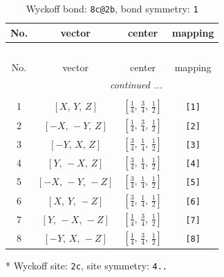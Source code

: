 \documentclass[fleqn,8pt]{jsarticle}
\begin{document}
\renewcommand{\arraystretch}{1.2}
\begin{longtable}{cccc}
\caption{Wyckoff bond: {\tt 8c@2b}, bond symmetry: {\tt 1}}
 \\
 \hline \hline
No. & vector & center & mapping \\ \hline \endfirsthead

\multicolumn{3}{l}{\tablename\ \thetable{}} \\
 \hline \hline
No. & vector & center & mapping \\ \hline \endhead

 \hline \hline
\multicolumn{3}{r}{\footnotesize\it continued ...} \\ \endfoot

 \hline \hline
\multicolumn{3}{r}{} \\ \endlastfoot

1 & $\left[ X,\, Y,\, Z \right]$ & $\left[ \frac{1}{4},\, \frac{3}{4},\, \frac{1}{2} \right]$ & {\tt [1]} \\ \hline
2 & $\left[ - X,\, - Y,\, Z \right]$ & $\left[ \frac{1}{4},\, \frac{3}{4},\, \frac{1}{2} \right]$ & {\tt [2]} \\ \hline
3 & $\left[ - Y,\, X,\, Z \right]$ & $\left[ \frac{3}{4},\, \frac{1}{4},\, \frac{1}{2} \right]$ & {\tt [3]} \\ \hline
4 & $\left[ Y,\, - X,\, Z \right]$ & $\left[ \frac{3}{4},\, \frac{1}{4},\, \frac{1}{2} \right]$ & {\tt [4]} \\ \hline
5 & $\left[ - X,\, - Y,\, - Z \right]$ & $\left[ \frac{3}{4},\, \frac{1}{4},\, \frac{1}{2} \right]$ & {\tt [5]} \\ \hline
6 & $\left[ X,\, Y,\, - Z \right]$ & $\left[ \frac{3}{4},\, \frac{1}{4},\, \frac{1}{2} \right]$ & {\tt [6]} \\ \hline
7 & $\left[ Y,\, - X,\, - Z \right]$ & $\left[ \frac{1}{4},\, \frac{3}{4},\, \frac{1}{2} \right]$ & {\tt [7]} \\ \hline
8 & $\left[ - Y,\, X,\, - Z \right]$ & $\left[ \frac{1}{4},\, \frac{3}{4},\, \frac{1}{2} \right]$ & {\tt [8]} \\
\end{longtable}
* Wyckoff site: {\tt 2c}, site symmetry: {\tt 4..}
\renewcommand{\arraystretch}{1.2}
\end{document}

